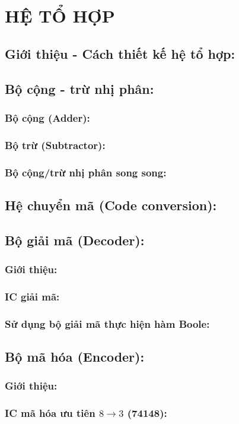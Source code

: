 \section{HỆ TỔ HỢP}
\subsection{Giới thiệu - Cách thiết kế hệ tổ hợp:}
\subsection{Bộ cộng - trừ nhị phân:}
\subsubsection{Bộ cộng (Adder):}
\subsubsection{Bộ trừ (Subtractor):}
\subsubsection{Bộ cộng/trừ nhị phân song song:}
\subsection{Hệ chuyển mã (Code conversion):}
\subsection{Bộ giải mã (Decoder):}
\subsubsection{Giới thiệu:}
\subsubsection{IC giải mã:}
\subsubsection{Sử dụng bộ giải mã thực hiện hàm Boole:}
\subsection{Bộ mã hóa (Encoder):}
\subsubsection{Giới thiệu:}
\subsubsection{IC mã hóa ưu tiên $8 \to 3$ (74148):}
